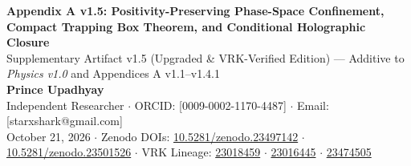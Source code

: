 \documentclass[11pt,a4paper]{article}
\theoremstyle{remark}
\begin{document}
\begin{center}
    {\LARGE\bfseries Appendix A v1.5: Positivity-Preserving Phase-Space Confinement, Compact Trapping Box Theorem, and Conditional Holographic Closure}\\[4pt]
    {\large Supplementary Artifact v1.5 (Upgraded \& VRK-Verified Edition) --- Additive to \textit{Physics v1.0} and Appendices A v1.1--v1.4.1}\\[4pt]
    {\normalsize \textbf{Prince Upadhyay}}\\
    {\small Independent Researcher $\cdot$ ORCID: [0009-0002-1170-4487] $\cdot$ Email: [starxshark@gmail.com]}\\
    {\small October 21, 2026 $\cdot$ Zenodo DOIs: \href{https://doi.org/10.5281/zenodo.23497142}{10.5281/zenodo.23497142} $\cdot$ \href{https://doi.org/10.5281/zenodo.23501526}{10.5281/zenodo.23501526} $\cdot$ VRK Lineage: \href{https://doi.org/10.5281/zenodo.23018459}{23018459} $\cdot$ \href{https://doi.org/10.5281/zenodo.23016445}{23016445} $\cdot$ \href{https://doi.org/10.5281/zenodo.23474505}{23474505}}
\end{center}
\end{document}
